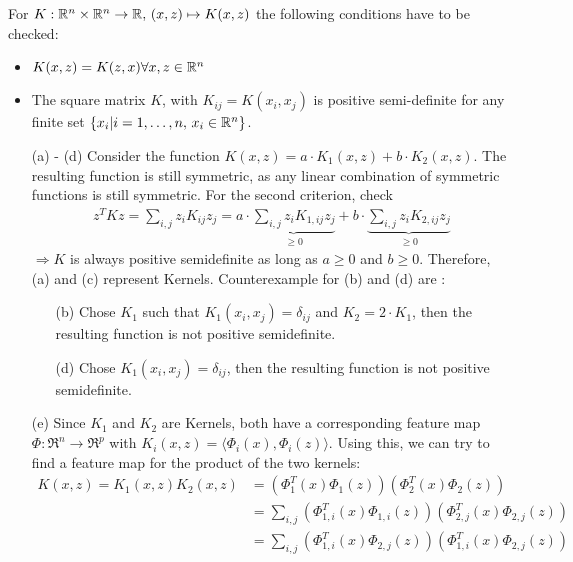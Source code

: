 \begin{answer}
For $K:{\mathbb R}^{{n}} \times {\mathbb R}^{{n}} \rightarrow {\mathbb R},\, (x,z) \mapsto K(x,z)$ the following conditions have to be checked:
\begin{itemize}
    \item $K(x,z) = K(z, x) \forall x,z\in{\mathbb R}^{{n}}$
    \item The square matrix $K$, with $K_{ij} = K(x_i, x_j)$ is positive semi-definite for any finite set $\{x_i | i=1,\ldots,n,\, x_i \in{\mathbb R}^{{n}}\}$.
\end{itemize}
\begin{enumerate}
    \item[(a) - (d)] Consider the function $K(x,z)=a\cdot K_1(x,z)+b\cdot K_2(x,z)$. The resulting function is still symmetric, as any linear
    combination of symmetric functions is still symmetric.
     For the second criterion, check
     \begin{align*}
        z^T K z = \sum_{i,j} z_i K_{ij} z_j 
        =  a\cdot \underbrace{\sum_{i,j} z_i K_{1,ij}z_j}_{\geq 0} + b \cdot \underbrace{\sum_{i,j} z_iK_{2,ij}z_j}_{\geq 0}
     \end{align*}
     $\Rightarrow K$ is always positive semidefinite as long as $a\geq 0$ and $b\geq 0$.
     Therefore, (a) and (c) represent Kernels.
     Counterexample for (b) and (d) are :
     \begin{itemize}
        \item[(b)] Chose $K_1$ such that $K_1(x_i,x_j) = \delta_{ij}$ and $K_2 = 2\cdot K_1$,
         then the resulting function is not positive semidefinite.
        \item[(d)] Chose $K_1(x_i,x_j) = \delta_{ij}$, then the resulting function is not positive semidefinite.
     \end{itemize}
     \item[(e)] Since $K_1$ and $K_2$ are Kernels, both have a corresponding feature map $\Phi: \Re^n \rightarrow \Re^p$ with 
    $K_{i}(x,z)=\langle\Phi_{i}(x), \Phi_{i}(z)\rangle$.
    Using this, we can try to find a feature map for the product of the two kernels:
     \begin{align*}
        K(x,z) = K_1(x,z) K_2(x,z) &= (\Phi_{1}^T(x) \Phi_{1}(z))   (\Phi_{2}^T(x) \Phi_{2}(z)) \\
        &= \sum_{i,j} (\Phi_{1,i}^T(x) \Phi_{1,i}(z)) (\Phi_{2,j}^T(x) \Phi_{2,j}(z)) \\
        &= \sum_{i,j} (\Phi_{1,i}^T(x) \Phi_{2,j}(z)) (\Phi_{1,i}^T(x) \Phi_{2,j}(z)) \\

\end{align*}
\end{enumerate}
\end{answer}
